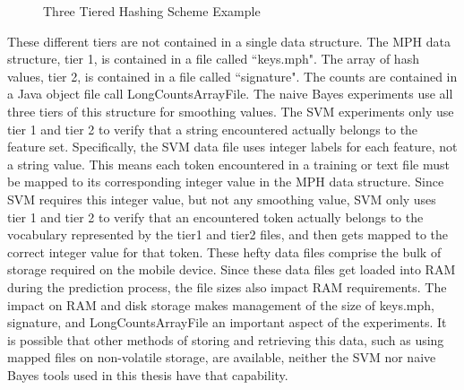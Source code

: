 		\begin{figure}[ht!]
			\begin{center}
				\caption{Three Tiered Hashing Scheme Example}
				\label{fig:3tierHashExample}
			\end{center}
		\end{figure}
		
		These different tiers are not contained in a single data structure.  The MPH data structure, tier 1, is contained in a file called ``keys.mph".  The array of hash values, tier 2, is contained in a file called ``signature".  The counts are contained in a Java object file call LongCountsArrayFile.  The naive Bayes experiments use all three tiers of this structure for smoothing values.  The SVM experiments only use tier 1 and tier 2 to verify that a string encountered actually belongs to the feature set.  Specifically, the SVM data file uses integer labels for each feature, not a string value.  This means each token encountered in a training or text file must be mapped to its corresponding integer value in the MPH data structure.  Since SVM requires this integer value, but not any smoothing value, SVM only uses tier 1 and tier 2 to verify that an encountered token actually belongs to the vocabulary represented by the tier1 and tier2 files, and then gets mapped to the correct integer value for that token. These hefty data files comprise the bulk of storage required on the mobile device.  Since these data files get loaded into RAM during the prediction process, the file sizes also impact RAM requirements. The impact on RAM and disk storage makes management of the size of keys.mph, signature, and LongCountsArrayFile an important aspect of the experiments.  It is possible that other methods of storing and retrieving this data, such as using mapped files on non-volatile storage, are available, neither the SVM nor naive Bayes tools used in this thesis have that capability.

